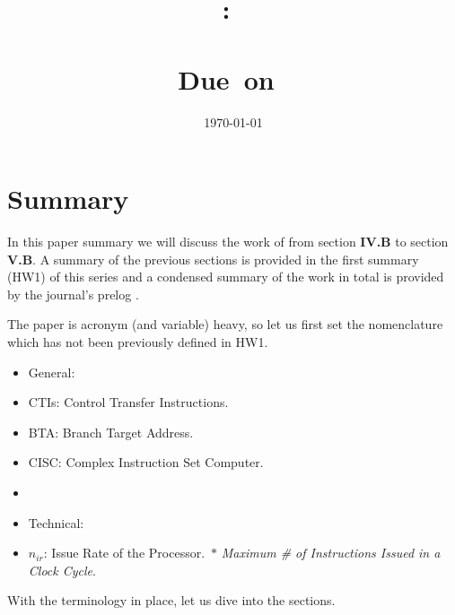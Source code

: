\documentclass{article}
\title{
    \vspace{2in}
    \textmd{\textbf{\hmwkClass:\ \\ \hmwkTitle}}\\
    \normalsize\vspace{0.1in}\small{Due\ on\ \hmwkDueDate}\\
    \vspace{0.1in}\Large{\textit{\paprTitle}}
    \vspace{3in}
}
\author{\hmwkAuthorName}
\date{\today}
\begin{document}
\maketitle

\pagebreak

\section{Summary}

In this paper summary we will discuss the work of \cite{Sima} 
from section \textbf{IV.B} to section \textbf{V.B}.
A summary of the previous sections is provided in the first summary (HW1) of this series and a condensed summary of the work in total is provided by the journal's prelog \cite{Falk}.

The paper is acronym (and variable) heavy, so let us first set the nomenclature which has not been previously defined in HW1. 

\begin{itemize}
    \item[] General:
    \item CTIs: Control Transfer Instructions.
    \item BTA: Branch Target Address. 
    \item CISC: Complex Instruction Set Computer.
    \item[] \dotfill
    \item[] Technical:
    \item \(n_{ir}\): Issue Rate of the Processor.\ 
    \subitem \(\ast\) \emph{Maximum \# of Instructions Issued in a Clock Cycle}.
\end{itemize}
With the terminology in place, let us dive into the sections. 


\end{document}
